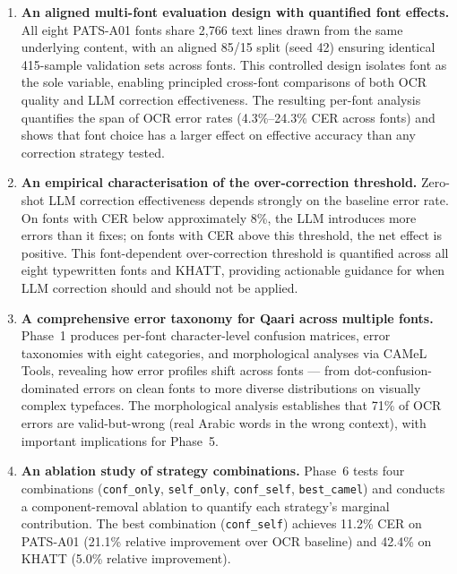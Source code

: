 \begin{enumerate}
  \item \textbf{An aligned multi-font evaluation design with quantified
  font effects.} All eight PATS-A01 fonts share 2,766 text lines drawn from
  the same underlying content, with an aligned 85/15 split (seed 42)
  ensuring identical 415-sample validation sets across fonts. This controlled
  design isolates font as the sole variable, enabling principled cross-font
  comparisons of both OCR quality and LLM correction effectiveness. The
  resulting per-font analysis quantifies the span of OCR error rates
  (4.3\%--24.3\% CER across fonts) and shows that font choice has a larger
  effect on effective accuracy than any correction strategy tested.

  \item \textbf{An empirical characterisation of the over-correction
  threshold.} Zero-shot LLM correction effectiveness depends strongly on the
  baseline error rate. On fonts with CER below approximately 8\%, the LLM
  introduces more errors than it fixes; on fonts with CER above this
  threshold, the net effect is positive. This font-dependent over-correction
  threshold is quantified across all eight typewritten fonts and KHATT,
  providing actionable guidance for when LLM correction should and should not
  be applied.

  \item \textbf{A comprehensive error taxonomy for Qaari across multiple
  fonts.} Phase~1 produces per-font character-level confusion matrices,
  error taxonomies with eight categories, and morphological analyses via
  CAMeL Tools, revealing how error profiles shift across fonts --- from
  dot-confusion-dominated errors on clean fonts to more diverse distributions
  on visually complex typefaces. The morphological analysis establishes that
  71\% of OCR errors are valid-but-wrong (real Arabic words in the wrong
  context), with important implications for Phase~5.

  \item \textbf{An ablation study of strategy combinations.} Phase~6 tests
  four combinations (\texttt{conf\_only}, \texttt{self\_only},
  \texttt{conf\_self}, \texttt{best\_camel}) and conducts a component-removal
  ablation to quantify each strategy's marginal contribution. The best
  combination (\texttt{conf\_self}) achieves 11.2\% CER on PATS-A01
  (21.1\% relative improvement over OCR baseline) and 42.4\% on KHATT
  (5.0\% relative improvement).


\end{enumerate}
